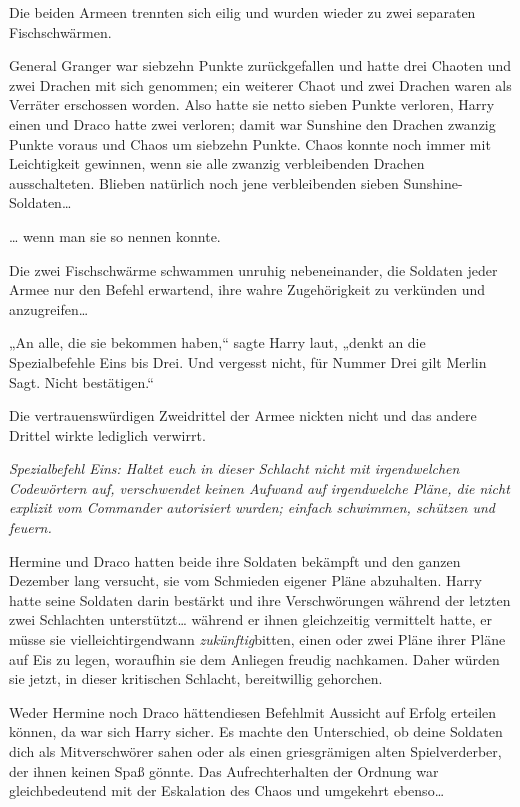 {Die beiden Armeen trennten sich eilig und wurden wieder zu zwei separaten Fischschwärmen.

General Granger war siebzehn Punkte zurückgefallen und hatte drei Chaoten und zwei Drachen mit sich genommen; ein weiterer Chaot und zwei Drachen waren als Verräter erschossen worden. Also hatte sie netto sieben Punkte verloren, Harry einen und Draco hatte zwei verloren; damit war Sunshine den Drachen zwanzig Punkte voraus und Chaos um siebzehn Punkte. Chaos konnte noch immer mit Leichtigkeit gewinnen, wenn sie alle zwanzig verbleibenden Drachen ausschalteten. Blieben natürlich noch jene verbleibenden sieben Sunshine-Soldaten…

… wenn man sie so nennen konnte.

Die zwei Fischschwärme schwammen unruhig nebeneinander, die Soldaten jeder Armee nur den Befehl erwartend, ihre wahre Zugehörigkeit zu verkünden und anzugreifen…

„An alle, die sie bekommen haben,“ sagte Harry laut, „denkt an die Spezialbefehle Eins bis Drei. Und vergesst nicht, für Nummer Drei gilt Merlin Sagt. Nicht bestätigen.“

Die vertrauenswürdigen Zweidrittel der Armee nickten nicht und das andere Drittel wirkte lediglich verwirrt.

\emph{Spezialbefehl Eins: Haltet euch in dieser Schlacht nicht mit irgendwelchen Codewörtern auf, verschwendet keinen Aufwand auf irgendwelche Pläne, die nicht explizit vom Commander autorisiert wurden; einfach schwimmen, schützen und feuern.}

Hermine und Draco hatten beide ihre Soldaten bekämpft und den ganzen Dezember lang versucht, sie vom Schmieden eigener Pläne abzuhalten. Harry hatte seine Soldaten darin bestärkt und ihre Verschwörungen während der letzten zwei Schlachten unterstützt… während er ihnen gleichzeitig vermittelt hatte, er müsse sie vielleichtirgendwann \emph{zukünftig}bitten, einen oder zwei Pläne ihrer Pläne auf Eis zu legen, woraufhin sie dem Anliegen freudig nachkamen. Daher würden sie jetzt, in dieser kritischen Schlacht, bereitwillig gehorchen.

Weder Hermine noch Draco hättendiesen Befehlmit Aussicht auf Erfolg erteilen können, da war sich Harry sicher. Es machte den Unterschied, ob deine Soldaten dich als Mitverschwörer sahen oder als einen griesgrämigen alten Spielverderber, der ihnen keinen Spaß gönnte. Das Aufrechterhalten der Ordnung war gleichbedeutend mit der Eskalation des Chaos und umgekehrt ebenso…

}
